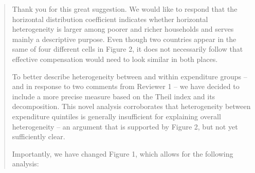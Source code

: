 \documentclass[11pt]{article}
\newenvironment{response}
{\begin{quote}\color{black}}
{\end{quote}}
\begin{document}
\begin{response}
    Thank you for this great suggestion. We would like to respond that the horizontal distribution coefficient indicates whether horizontal heterogeneity is larger among poorer and richer households and serves mainly a descriptive purpose. Even though two countries appear in the same of four different cells in Figure 2, it does not necessarily follow that effective compensation would need to look similar in both places. 
    
    To better describe heterogeneity between and within expenditure groups -- and in response to two comments from Reviewer 1 -- we have decided to include a more precise measure based on the Theil index and its decomposition. This novel analysis corroborates that heterogeneity between expenditure quintiles is generally insufficient for explaining overall heterogeneity -- an argument that is supported by Figure 2, but not yet sufficiently clear.

    Importantly, we have changed Figure 1, which allows for the following analysis:

\end{response}
\end{document}
